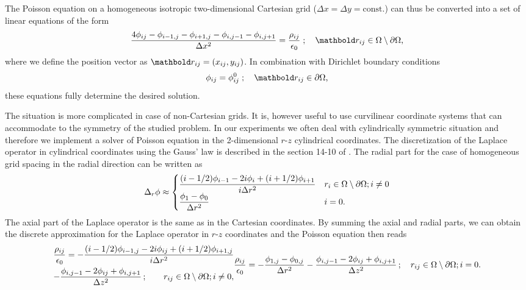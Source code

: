 The Poisson equation on a homogeneous isotropic two-dimensional Cartesian grid ($\Delta x = \Delta y = \text{const.}$) can thus
be converted into a set of linear equations of the form
\begin{equation}
\frac{4\phi_{ij} - \phi_{i-1,j} - \phi_{i+1,j} - \phi_{i,j-1} - \phi_{i,j+1}}
    {\Delta x^2} = \frac{\rho_{ij}}{\epsilon_0}\;;\quad \mb r_{ij} \in \Omega\setminus\partial\Omega\text,
\label{eq_sim_poiscart}
\end{equation}
where we define the position vector as $\mb r_{ij} = (x_{ij}, y_{ij})$.
In combination with Dirichlet boundary conditions
\begin{equation}
\phi_{ij} = \phi^0_{ij}\;;\quad \mb r_{ij} \in \partial\Omega\text,
\label{eq_sim_boundary}
\end{equation}
these equations fully determine the desired solution.

The situation is more complicated in case of non-Cartesian grids. It is,
however useful to use curvilinear coordinate systems that can accommodate to the symmetry of the studied problem.
In our experiments we often deal with cylindrically symmetric situation and therefore we implement a solver of Poisson equation in the 2-dimensional
$r$-$z$ cylindrical coordinates.
The discretization of the Laplace operator
in cylindrical coordinates using the Gauss' law is described in the section 14-10 of \cite{birdsall1991}.
The radial part for the case of homogeneous grid spacing in the radial direction can be written as
\begin{equation}
\Delta_r\phi\approx
\begin{cases}
    \displaystyle\frac{(i-1/2)\phi_{i-1} - 2i\phi_{i} + (i+1/2)\phi_{i+1}}
    {i\Delta r^2} & r_{i} \in \Omega\setminus\partial\Omega; i\neq0\\
    \displaystyle\frac{\phi_{1} - \phi_{0}}
    {\Delta r^2} & i=0\text.
\end{cases}
\end{equation}
The axial part of the Laplace operator is the same as in the Cartesian
coordinates. By summing the axial and radial parts, we can obtain the discrete approximation for the
Laplace operator in $r$-$z$ coordinates and the Poisson equation then reads
\begin{subequations}
\begin{multline}
\frac{\rho_{ij}}{\epsilon_0} = 
    -\frac{(i-1/2)\phi_{i-1,j} - 2i\phi_{ij} + (i+1/2)\phi_{i+1,j}}
    {i\Delta r^2}\\
    -\frac{\phi_{i,j-1} - 2\phi_{ij} + \phi_{i,j+1}}
    {\Delta z^2}\,;\quad\hfill
 r_{ij} \in \Omega\setminus\partial\Omega; i\neq0,\\
\end{multline}
\begin{multline}
\frac{\rho_{ij}}{\epsilon_0} = 
    -\frac{\phi_{1,j} - \phi_{0,j}}
    {\Delta r^2}
    -\frac{\phi_{i,j-1} - 2\phi_{ij} + \phi_{i,j+1}}
    {\Delta z^2}\,;\quad\hfill
 r_{ij} \in \Omega\setminus\partial\Omega; i=0.\\
\end{multline}
\end{subequations}

